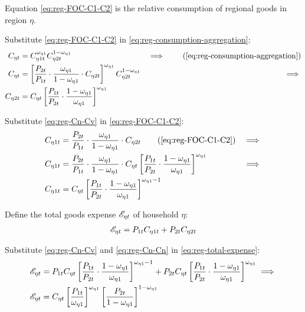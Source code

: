 \documentclass[../thesis.tex]{subfiles}
\begin{document}
Equation \ref{eq:reg-FOC-C1-C2} is the relative consumption of regional goods in region $\eta$.

Substitute \ref{eq:reg-FOC-C1-C2} in \ref{eq:reg-consumption-aggregation}:
\begin{alignat}{2}
	C_{\eta t} &= C_{\eta 1 t}^{\omega_{\eta 1}} C_{\eta 2 t}^{1-\omega_{\eta 1}} &\implies \tag{\ref{eq:reg-consumption-aggregation}} \\
	C_{\eta t} &= \left[ \frac{P_{2 t}}{P_{1 t}} \cdot \frac{\omega_{\eta 1}}{1 -\omega_{\eta 1}} \cdot C_{\eta 2 t} \right]^{\omega_{\eta 1}} C_{\eta 2 t}^{1-\omega_{\eta 1}} &\implies \nonumber \\
	C_{\eta 2 t} &= C_{\eta t} \left[ \frac{P_{1 t}}{P_{2 t}} \cdot \frac{1 -\omega_{\eta 1}}{\omega_{\eta 1}} \right]^{\omega_{\eta 1}} \label{eq:reg-Cn-Cv}
\end{alignat}

Substitute \ref{eq:reg-Cn-Cv} in \ref{eq:reg-FOC-C1-C2}:
\begin{alignat}{2}
	C_{\eta 1 t} &= \frac{P_{2 t}}{P_{1 t}} \cdot \frac{\omega_{\eta 1}}{1 -\omega_{\eta 1}} \cdot C_{\eta 2 t} \tag{\ref{eq:reg-FOC-C1-C2}} &\implies \nonumber \\
	C_{\eta 1 t} &= \frac{P_{2 t}}{P_{1 t}} \cdot \frac{\omega_{\eta 1}}{1 -\omega_{\eta 1}} \cdot C_{\eta t} \left[ \frac{P_{1 t}}{P_{2 t}} \cdot \frac{1 -\omega_{\eta 1}}{\omega_{\eta 1}} \right]^{\omega_{\eta 1}} &\implies \nonumber \\
	C_{\eta 1 t} &= C_{\eta t} \left[ \frac{P_{1 t}}{P_{2 t}} \cdot \frac{1 -\omega_{\eta 1}}{\omega_{\eta 1}} \right]^{\omega_{\eta 1} -1} \label{eq:reg-Cn-Cn}
\end{alignat}

Define the total goods expense ${\mathscr{E}_{\eta t}}$ of household $\eta$:
\begin{align}
	{\mathscr{E}_{\eta t}} = P_{1 t} C_{\eta 1 t} + P_{2 t} C_{\eta 2 t} \label{eq:reg-total-expense}
\end{align}

Substitute \ref{eq:reg-Cn-Cv} and \ref{eq:reg-Cn-Cn} in \ref{eq:reg-total-expense}:
\begin{align}
	{\mathscr{E}_{\eta t}} &= P_{1 t} C_{\eta t} \left[ \frac{P_{1 t}}{P_{2 t}} \cdot \frac{1 -\omega_{\eta 1}}{\omega_{\eta 1}} \right]^{\omega_{\eta 1} -1} + P_{2 t} C_{\eta t} \left[ \frac{P_{1 t}}{P_{2 t}} \cdot \frac{1 -\omega_{\eta 1}}{\omega_{\eta 1}} \right]^{\omega_{\eta 1}} \implies \nonumber \\
	{\mathscr{E}_{\eta t}} &= C_{\eta t} \left[ \frac{P_{1 t}}{\omega_{\eta 1}} \right]^{\omega_{\eta 1}} \left[ \frac{P_{2 t}}{1 -\omega_{\eta 1}} \right]^{1 -\omega_{\eta 1}} \label{eq:reg-total-expense-level}
\end{align}
\end{document}
